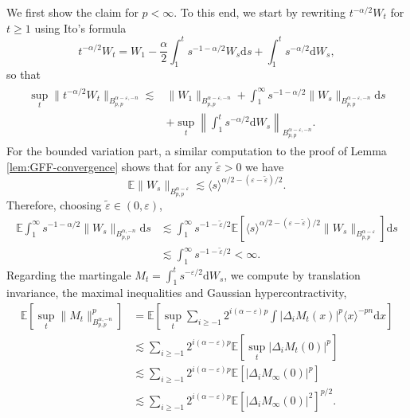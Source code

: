 \documentclass[11pt, a4paper]{scrartcl}
\numberwithin{equation}{section}
\theoremstyle{plain}
\theoremstyle{remark}
\newcommand{\mathd}{\mathrm{d}}
\begin{document}
\label{app:pf-lem-W-Halpha}We first show the claim for $p < \infty$. To this
end, we start by rewriting $t^{- \alpha / 2} W_t$ for $t \geqslant 1$ using
Ito's formula
\[ t^{- \alpha / 2} W_t = W_1 - \frac{\alpha}{2}\int_1^t s^{- 1 - \alpha / 2} W_s \mathd s +
   \int_1^t s^{- \alpha / 2} \mathd W_s, \]
so that
\begin{align}
  \begin{split}
    \sup_t \| t^{- \alpha / 2} W_t \|_{B_{p, p}^{\alpha - \varepsilon, - n}}
    \lesssim &\| W_1 \|_{B_{p, p}^{\alpha - \varepsilon, - n}} + \int_1^{\infty}
    s^{- 1 - \alpha / 2} \| W_s \|_{B_{p, p}^{\alpha - \varepsilon, - n}} \mathd
    s \\ &+ \sup_t \left\| \int_1^t s^{- \alpha / 2} \mathd W_s \right\|_{B_{p,
    p}^{\alpha - \varepsilon, - n}} . \label{eq:DDC-W}
  \end{split}
\end{align}
For the bounded variation part, a similar computation to the proof of Lemma
\ref{lem:GFF-convergence} shows that for any $\tilde{\varepsilon} > 0$ we have
\[ \mathbb{E} \| W_s \|_{B^{\alpha - \varepsilon}_{p, p}} \lesssim \langle s
   \rangle^{\alpha / 2 - (\varepsilon - \tilde{\varepsilon}) / 2} . \]
Therefore, choosing $\tilde{\varepsilon} \in (0, \varepsilon)$,
\begin{align*}
  \mathbb{E} \int_1^{\infty} s^{- 1 - \alpha / 2} \| W_s \|_{B_{p,
   p}^{\alpha, - n}} \mathd s
   &\lesssim \int_1^{\infty} s^{- 1 -
   \tilde{\varepsilon} / 2} \mathbb{E} [\langle s \rangle^{\alpha / 2 -
   (\varepsilon - \tilde{\varepsilon}) / 2} \| W_s \|_{B^{\alpha -
   \varepsilon}_{p, p}}] \mathd s \\
   &\lesssim \int_1^{\infty} s^{- 1 -
   \tilde{\varepsilon} / 2} < \infty .
\end{align*}
Regarding the martingale $M_t = \int_1^t s^{- \varepsilon / 2} \mathd W_s$, we
compute by translation invariance, the maximal inequalities and Gaussian
hypercontractivity,
\[ \begin{aligned}
     \mathbb{E} [\sup_t \| M_t \|^p_{B^{\alpha, - n}_{p, p}}] &= \mathbb{E}
     \left[ \sup_t \sum_{i \geqslant - 1} 2^{i (\alpha - \varepsilon) p}  \int
     | \Delta_i M_t (x) |^p \langle x \rangle^{- pn} \mathd x \right]\\
     & \lesssim  \sum_{i \geqslant - 1} 2^{i (\alpha - \varepsilon) p}
     \mathbb{E} [\sup_t  | \Delta_i M_t (0) |^p]\\
     &\lesssim  \sum_{i \geqslant - 1} 2^{i (\alpha - \varepsilon) p}
     \mathbb{E} [| \Delta_i M_{\infty} (0) |^p]\\
     &\lesssim  \sum_{i \geqslant - 1} 2^{i (\alpha - \varepsilon) p}
     \mathbb{E} [| \Delta_i M_{\infty} (0) |^2]^{p / 2} .
   \end{aligned} \]
\end{document}
